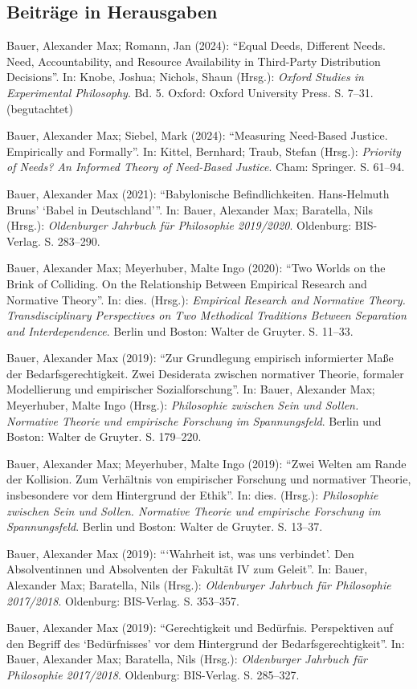 \documentclass[a4paper,10pt]{article}
\newenvironment{literature}{%
   \parskip6pt\parindent0pt\raggedright
   \def\lititem{\hangindent=1cm\hangafter1}}{%
   \par\ignorespaces}
\begin{document}
\subsection*{Beiträge in Herausgaben}
\begin{literature}
\lititem Bauer, Alexander Max; Romann, Jan (2024): \enquote{Equal Deeds, Different Needs. Need, Accountability, and Resource Availability in Third-Party Distribution Decisions}. In: Knobe, Joshua; Nichols, Shaun (Hrsg.): \textit{Oxford Studies in Experimental Philosophy}. Bd. 5. Oxford: Oxford University Press. S. 7--31. (begutachtet)

\lititem Bauer, Alexander Max; Siebel, Mark (2024): \enquote{Measuring Need-Based Justice. Empirically and Formally}. In: Kittel, Bernhard; Traub, Stefan (Hrsg.): \textit{Priority of Needs? An Informed Theory of Need-Based Justice}. Cham: Springer. S. 61--94.

\lititem Bauer, Alexander Max (2021): \enquote{Babylonische Befindlichkeiten. Hans-Helmuth Bruns' \enquote{Babel in Deutschland}}. In: Bauer, Alexander Max; Baratella, Nils (Hrsg.): \textit{Oldenburger Jahrbuch für Philosophie 2019/2020}. Oldenburg: BIS-Verlag. S. 283--290.

\lititem Bauer, Alexander Max; Meyerhuber, Malte Ingo (2020): \enquote{Two Worlds on the Brink of Colliding. On the Relationship Between Empirical Research and Normative Theory}. In: dies. (Hrsg.): \textit{Empirical Research and Normative Theory. Transdisciplinary Perspectives on Two Methodical Traditions Between Separation and Interdependence}. Berlin und Boston: Walter de Gruyter. S. 11--33.

\lititem Bauer, Alexander Max (2019): \enquote{Zur Grundlegung empirisch informierter Maße der Bedarfsgerechtigkeit. Zwei Desiderata zwischen normativer Theorie, formaler Modellierung und empirischer Sozialforschung}. In: Bauer, Alexander Max; Meyerhuber, Malte Ingo (Hrsg.): \textit{Philosophie zwischen Sein und Sollen. Normative Theorie und empirische Forschung im Spannungsfeld}. Berlin und Boston: Walter de Gruyter. S. 179--220.

\lititem Bauer, Alexander Max; Meyerhuber, Malte Ingo (2019): \enquote{Zwei Welten am Rande der Kollision. Zum Verhältnis von empirischer Forschung und normativer Theorie, insbesondere vor dem Hintergrund der Ethik}. In: dies. (Hrsg.): \textit{Philosophie zwischen Sein und Sollen. Normative Theorie und empirische Forschung im Spannungsfeld}. Berlin und Boston: Walter de Gruyter. S. 13--37.

\lititem Bauer, Alexander Max (2019): \enquote{\enquote{Wahrheit ist, was uns verbindet}. Den Absolventinnen und Absolventen der Fakultät IV zum Geleit}. In: Bauer, Alexander Max; Baratella, Nils (Hrsg.): \textit{Oldenburger Jahrbuch für Philosophie 2017/2018}. Oldenburg: BIS-Verlag. S. 353--357.

\lititem Bauer, Alexander Max (2019): \enquote{Gerechtigkeit und Bedürfnis. Perspektiven auf den Begriff des \enquote{Bedürfnisses} vor dem Hintergrund der Bedarfsgerechtigkeit}. In: Bauer, Alexander Max; Baratella, Nils (Hrsg.): \textit{Oldenburger Jahrbuch für Philosophie 2017/2018}. Oldenburg: BIS-Verlag. S. 285--327.
\end{literature}
\end{document}
